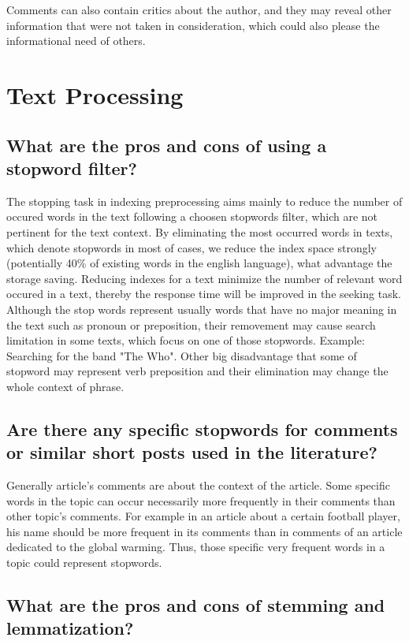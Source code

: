 \documentclass{scrartcl}
\begin{document}
Comments can also contain critics about the author, and they may reveal other information that were not taken in consideration, which could also please the informational need of others.


\section{Text Processing}

\subsection{What are the pros and cons of using a stopword filter? }

The stopping task in indexing preprocessing aims mainly to reduce the number of occured words in the text following a choosen stopwords filter, which are not pertinent for the text context. By eliminating the most occurred words in texts, which denote stopwords in most of cases, we reduce the index space strongly (potentially 40\% of existing words in the english language), what advantage the storage saving. Reducing indexes for a text minimize the number of relevant word occured in a text, thereby the response time will be improved in the seeking task.
Although the stop words represent usually words that have no major meaning in the text such as pronoun or preposition, their removement may cause search limitation in some texts, which focus on one of those stopwords. Example: Searching for the band "The Who". Other big disadvantage that some of stopword may represent verb preposition and their elimination may change the whole context of phrase.


\subsection{Are there any specific stopwords for comments or similar short posts used in the literature?}

Generally article's comments are about the context of the article. Some specific words in the topic can occur necessarily more frequently in their comments than other topic's comments. For example in an article about a certain football player, his name should be more frequent in its comments than in comments of an article dedicated to the global warming. Thus, those specific very frequent words in a topic could represent stopwords.

\subsection{What are the pros and cons of stemming and lemmatization?}
\end{document}
